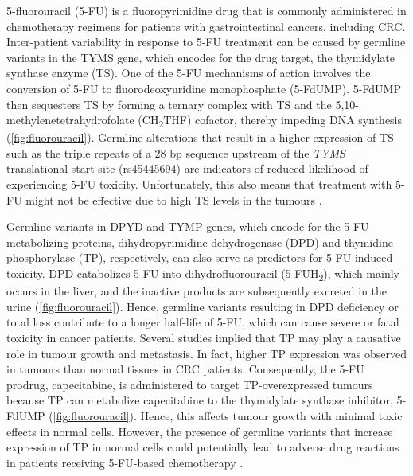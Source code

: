 5-fluorouracil (5-FU) is a fluoropyrimidine drug that is commonly administered in chemotherapy regimens for patients with gastrointestinal cancers, including \acs{CRC}. Inter-patient variability in response to 5-FU treatment can be caused by germline variants in the \acs{TYMS} gene, which encodes for the drug target, the thymidylate synthase enzyme (\acs{TS}). One of the 5-FU mechanisms of action involves the conversion of 5-FU to fluorodeoxyuridine monophosphate (5-FdUMP). 5-FdUMP then sequesters TS by forming a ternary complex with TS and the 5,10-methylenetetrahydrofolate (CH\textsubscript{2}THF) cofactor, thereby impeding DNA synthesis (\autoref{fig:fluorouracil}). Germline alterations that result in a higher expression of TS such as the triple repeats of a 28 bp sequence upstream of the \textit{TYMS} translational start site (rs45445694) are indicators of reduced likelihood of experiencing 5-FU toxicity. Unfortunately, this also means that treatment with 5-FU might not be effective due to high TS levels in the tumours \cite{Panczyk2014, Mohelnikova-Duchonova2014}.

Germline variants in \acs{DPYD} and \acs{TYMP} genes, which encode for the 5-FU metabolizing proteins, dihydropyrimidine dehydrogenase (\acs{DPD}) and thymidine phosphorylase (\acs{TP}), respectively, can also serve as predictors for 5-FU-induced toxicity. DPD catabolizes 5-FU into dihydrofluorouracil (5-FUH\textsubscript{2}), which mainly occurs in the liver, and the inactive products are subsequently excreted in the urine (\autoref{fig:fluorouracil}). Hence, germline variants resulting in DPD deficiency or total loss contribute to a longer half-life of 5-FU, which can cause severe or fatal toxicity in cancer patients. Several studies implied that TP may play a causative role in tumour growth and metastasis. In fact, higher TP expression was observed in tumours than normal tissues in CRC patients. Consequently, the 5-FU prodrug, capecitabine, is administered to target TP-overexpressed tumours because TP can metabolize capecitabine to the thymidylate synthase inhibitor, 5-FdUMP (\autoref{fig:fluorouracil}). Hence, this affects tumour growth with minimal toxic effects in normal cells. However, the presence of germline variants that increase expression of TP in normal cells could potentially lead to adverse drug reactions in patients receiving 5-FU-based chemotherapy \cite{Panczyk2014, Mohelnikova-Duchonova2014}.

